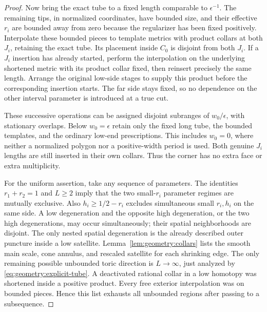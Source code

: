 \begin{proof}
Now bring the exact tube to a fixed length comparable to
$\epsilon^{-1}$.  The remaining tips, in normalized
coordinates, have bounded size, and their effective
$r_i$ are bounded away from zero because the regularizer
has been fixed positively.  Interpolate these bounded
pieces to template metrics with product collars at both
$J_i$, retaining the exact tube.  Its placement inside
$C_0$ is disjoint from both $J_i$.  If a $J_i$ insertion
has already started, perform the interpolation on the
underlying shortened metric with its product collar
fixed, then reinsert precisely the same length.  Arrange
the original low-side stages to supply this product
before the corresponding insertion starts.  The far
side stays fixed, so no dependence on the other interval
parameter is introduced at a true cut.

These successive operations can be assigned disjoint
subranges of $w_0/\epsilon$, with stationary overlaps.
Below $w_0=\epsilon$ retain only the fixed long tube,
the bounded templates, and the ordinary low-end
prescriptions.  This includes $w_0=0$, where neither a
normalized polygon nor a positive-width period is used.
Both genuine $J_i$ lengths are still inserted in their
own collars.  Thus the corner has no extra face or
extra multiplicity.

For the uniform assertion, take any sequence of parameters.
The identities $r_1+r_2=1$ and $L\ge2$ imply that the two
small-$r_i$ parameter regimes are mutually exclusive.
Also $h_i\ge1/2-r_i$ excludes simultaneous small $r_i,h_i$
on the same side.  A low degeneration and the opposite
high degeneration, or the two high degenerations, may
occur simultaneously; their spatial neighborhoods are
disjoint.  The only nested spatial degeneration is the
already described outer puncture inside a low satellite.
Lemma~\ref{lem:geometry:collars} lists
the smooth main scale, cone annulus, and rescaled satellite
for each shrinking edge.  The only remaining possible
unbounded toric direction is $L\to\infty$, just analyzed
by \eqref{eq:geometry:explicit-tube}.  A deactivated
rational collar in a low homotopy was shortened inside
a positive product.  Every free exterior interpolation
was on bounded pieces.  Hence this list exhausts all
unbounded regions after passing to a subsequence.


\end{proof}
